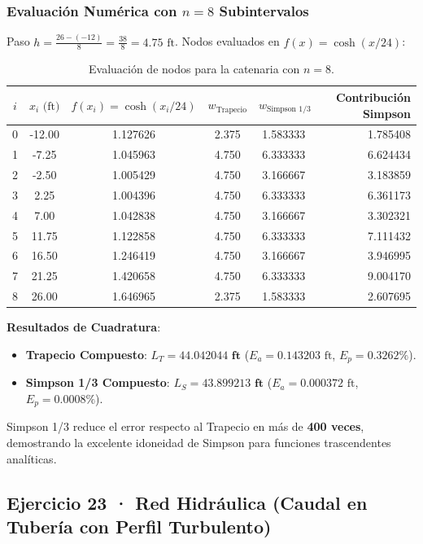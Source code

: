 \documentclass[11pt,a4paper]{article}
\begin{document}
\subsubsection{Evaluación Numérica con $n=8$ Subintervalos}
Paso $h = \frac{26 - (-12)}{8} = \frac{38}{8} = 4.75\text{ ft}$. Nodos evaluados en $f(x) = \cosh(x/24)$:
\begin{table}[h!]
\centering
\footnotesize
\caption{Evaluación de nodos para la catenaria con $n=8$.}
\begin{tabular}{ccccrr}
\toprule
$i$ & $x_i \text{ (ft)}$ & $f(x_i) = \cosh(x_i/24)$ & $w_{\text{Trapecio}}$ & $w_{\text{Simpson 1/3}}$ & Contribución Simpson \\
\midrule
0 & -12.00 & 1.127626 & 2.375 & 1.583333 & 1.785408 \\
1 & -7.25 & 1.045963 & 4.750 & 6.333333 & 6.624434 \\
2 & -2.50 & 1.005429 & 4.750 & 3.166667 & 3.183859 \\
3 & 2.25 & 1.004396 & 4.750 & 6.333333 & 6.361173 \\
4 & 7.00 & 1.042838 & 4.750 & 3.166667 & 3.302321 \\
5 & 11.75 & 1.122858 & 4.750 & 6.333333 & 7.111432 \\
6 & 16.50 & 1.246419 & 4.750 & 3.166667 & 3.946995 \\
7 & 21.25 & 1.420658 & 4.750 & 6.333333 & 9.004170 \\
8 & 26.00 & 1.646965 & 2.375 & 1.583333 & 2.607695 \\
\bottomrule
\end{tabular}
\end{table}

\textbf{Resultados de Cuadratura}:
\begin{itemize}
    \item \textbf{Trapecio Compuesto}: $L_T = \mathbf{44.042044 \text{ ft}}$ ($E_a = 0.143203\text{ ft}$, $E_p = 0.3262\%$).
    \item \textbf{Simpson 1/3 Compuesto}: $L_S = \mathbf{43.899213 \text{ ft}}$ ($E_a = 0.000372\text{ ft}$, $E_p = \mathbf{0.0008\%}$).
\end{itemize}
Simpson 1/3 reduce el error respecto al Trapecio en más de \textbf{400 veces}, demostrando la excelente idoneidad de Simpson para funciones trascendentes analíticas.

\subsection{Ejercicio 23 · Red Hidráulica (Caudal en Tubería con Perfil Turbulento)}
\end{document}
